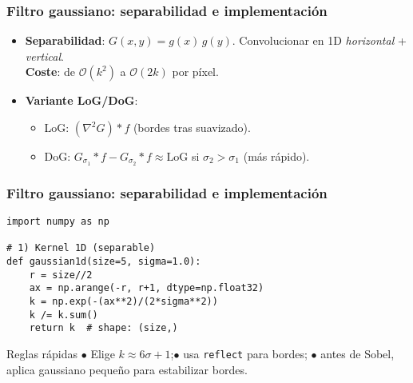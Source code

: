 \documentclass[10pt]{beamer}
\begin{document}
\begin{frame}[fragile]
\frametitle{Filtro gaussiano: separabilidad e implementaci\'on}
\begin{itemize}
  \item \textbf{Separabilidad}: $G(x,y)=g(x)\,g(y)$. Convolucionar en 1D \emph{horizontal} + \emph{vertical}.\\
        \textbf{Coste}: de $\mathcal{O}(k^2)$ a $\mathcal{O}(2k)$ por p\'ixel.
  \item \textbf{Variante LoG/DoG}: 
    \begin{itemize}
      \item LoG: $(\nabla^2 G)*f$ (bordes tras suavizado).
      \item DoG: $G_{\sigma_1}*f - G_{\sigma_2}*f \approx \text{LoG}$ si $\sigma_2\!>\!\sigma_1$ (m\'as r\'apido).
    \end{itemize}
\end{itemize}
\end{frame}

\begin{frame}[fragile]
\frametitle{Filtro gaussiano: separabilidad e implementaci\'on}
\vspace{1mm}
{\scriptsize
\begin{verbatim}
import numpy as np

# 1) Kernel 1D (separable)
def gaussian1d(size=5, sigma=1.0):
    r = size//2
    ax = np.arange(-r, r+1, dtype=np.float32)
    k = np.exp(-(ax**2)/(2*sigma**2))
    k /= k.sum()
    return k  # shape: (size,)
\end{verbatim}
}
\begin{block}{Reglas r\'apidas}
$\bullet$ Elige $k\!\approx\!6\sigma\!+\!1$;\quad $\bullet$ usa \texttt{reflect} para bordes;\quad
$\bullet$ antes de Sobel, aplica gaussiano peque\~no para estabilizar bordes.
\end{block}
\end{frame}
\end{document}
